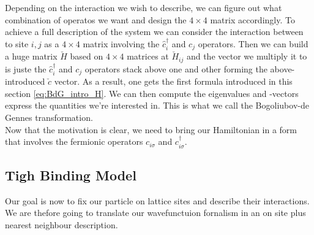 \documentclass[../main.tex]{subfile}
\begin{document}
Depending on the interaction we wish to describe, we can figure out what combination of operatos we want and design the $4\times4$ matrix accordingly.
To achieve a full description of the system we can consider the interaction between to site $i,j$ as a $4\times4$ matrix involving the $\hat{c}_i^{\dagger}$ and $c_j$ operators.
Then we can build a huge matrix $\check{H}$ based on $4\times4$ matrices at $\check{H}_{ij}$ and the vector we multiply it to is juste the $\hat{c}_i^{\dagger}$ and $c_j$ operators 
stack above one and other forming the above-introduced $\check{c}$ vector. As a result, one gets the first formula introduced in this section \ref{eq:BdG_intro_H}.
We can then compute the eigenvalues and -vectors express the quantities we're interested in. This is what we call the Bogoliubov-de Gennes transformation.\\

Now that the motivation is clear, we need to bring our Hamiltonian in a form that involves the fermionic operators $c_{i\sigma}$ and $c_{i\sigma}^{\dagger}$.
\subsection{Tigh Binding Model}
Our goal is now to fix our particle on lattice sites and describe their interactions. We are thefore going to translate our wavefunctuion fornalism in an on site plus
nearest neighbour description.\\
\end{document}
